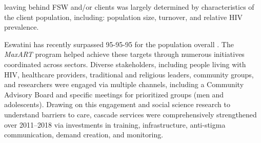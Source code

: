 leaving behind FSW and/or clients was largely determined by
characteristics of the client population, including:
population size, turnover, and relative HIV prevalence.
\par
Eswatini has recently surpassed 95-95-95 for the population overall \cite{SHIMS3}.
The \emph{MaxART} program \cite{MaxART2} helped achieve these targets through
numerous initiatives coordinated across sectors.
Diverse stakeholders, including people living with HIV, healthcare providers,
traditional and religious leaders, community groups, and researchers
were engaged via multiple channels, including a Community Advisory Board
and specific meetings for prioritized groups (men and adolescents).
Drawing on this engagement and
social science research to understand barriers to care,
cascade services were comprehensively strengthened over 2011--2018 via investments in
training, infrastructure, anti-stigma communication, demand creation, and monitoring.

